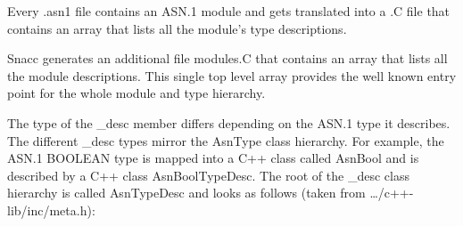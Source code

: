 Every {\ufn .asn1} file contains an ASN.1 module and gets translated into a {\ufn .C} file that contains an array that lists all the module's type descriptions.

Snacc generates an additional file {\ufn modules.C} that contains an array that lists all the module descriptions.
This single top level array provides the well known entry point for the whole module and type hierarchy.





The type of the {\C \_desc} member differs depending on the ASN.1 type it describes.
The different {\C \_desc} types mirror the {\C AsnType} class hierarchy.
For example, the ASN.1 BOOLEAN type is mapped into a C++ class called {\C AsnBool} and is described by a C++ class {\C AsnBoolTypeDesc}.
The root of the {\C \_desc} class hierarchy is called {\C AsnTypeDesc} and looks as follows
(taken from {\ufn \dots/c++-lib/inc/meta.h}):
